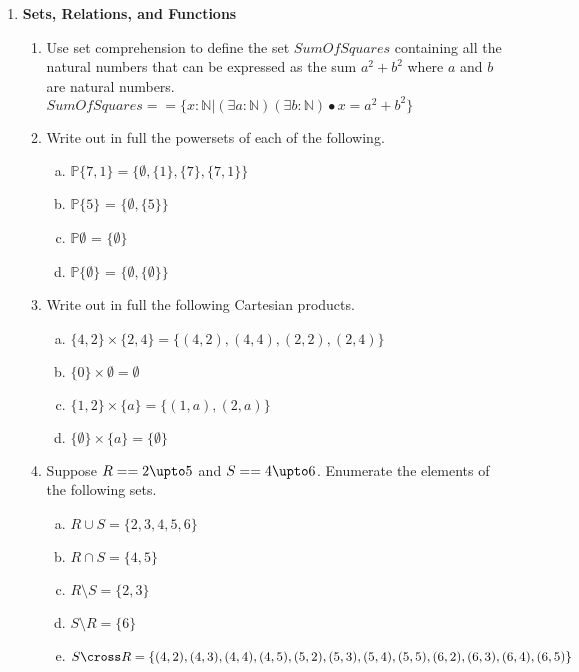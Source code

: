 \documentclass{article}
\newcommand{\define}{==}
\begin{document}

\begin{enumerate}[\bf I.]
\item \textbf{Sets, Relations, and Functions}
\begin{enumerate}[1.]
\item Use set comprehension to define the set $\mathit{SumOfSquares}$
containing all the natural numbers that can be expressed as the sum
$a^2 + b^2$ where $a$ and $b$ are natural numbers. \\
$SumOfSquares == \{x: \mathbb{N} | (\exists a : \mathbb{N}) (\exists b : \mathbb{N}) \bullet  x = a^2 + b^2 \}$ \\

\item Write out in full the powersets of each of the following.
\begin{enumerate}[a.]
\item $\mathbb{P}\{7,1\} = \{\emptyset, \{1\}, \{7\}, \{7,1\}\}$
\item $\mathbb{P}\{5\}$ = $\{\emptyset, \{5\}\}$
\item $\mathbb{P} \emptyset$ = $\{\emptyset\}$
\item $\mathbb{P}\{\emptyset\}$ = $\{\emptyset, \{\emptyset\}\}$
\end{enumerate}
\item Write out in full the following Cartesian products.
\begin{enumerate}[a.]
\item $\{4,2\}\times\{2,4\} = \{(4,2), (4,4), (2,2), (2,4)\}$
\item $\{0\}\times\emptyset = \emptyset$
\item $\{1,2\}\times\{a\} = \{(1,a), (2,a) \}$
\item $\{\emptyset\}\times\{a\} = \{\emptyset \}$
\end{enumerate}

\item Suppose $R \define 2 \upto 5$ and $S == 4 \upto 6$. Enumerate the elements of the following sets.

\begin{enumerate}[a.]
\item $R \cup S = \{2,3,4,5,6\}$
\item $R \cap S = \{4, 5\}$
\item $R \setminus S = \{2,3\}$
\item $S \setminus R = \{6\}$
\item $S \cross R = \{(4,2), (4,3), (4,4), (4,5), (5,2), (5,3), (5,4), (5,5), (6,2), (6,3), (6,4), (6,5)\}$
\end{enumerate}


\end{enumerate}
\end{enumerate}
\end{document}
